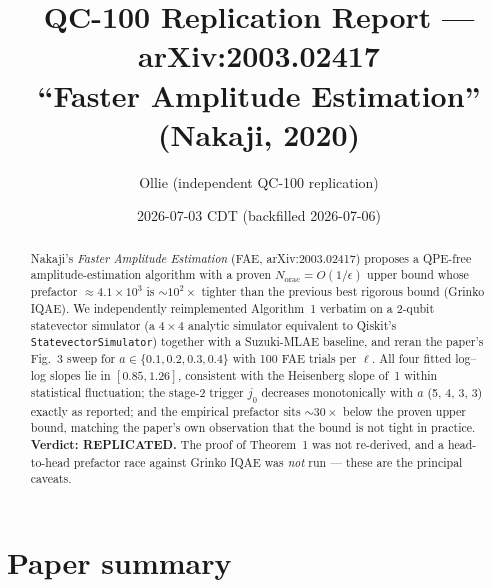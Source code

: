 \documentclass[11pt]{article}
\title{QC-100 Replication Report --- arXiv:2003.02417 \\
       \large ``Faster Amplitude Estimation'' (Nakaji, 2020)}
\author{Ollie (independent QC-100 replication)}
\date{2026-07-03 CDT (backfilled 2026-07-06)}
\begin{document}
\maketitle

\begin{abstract}
Nakaji's \emph{Faster Amplitude Estimation} (FAE, arXiv:2003.02417) proposes a QPE-free amplitude-estimation algorithm with a proven $N_{\mathrm{orac}} = O(1/\epsilon)$ upper bound whose prefactor $\approx 4.1\times 10^{3}$ is $\sim 10^{2}\times$ tighter than the previous best rigorous bound (Grinko IQAE). We independently reimplemented Algorithm~1 verbatim on a 2-qubit statevector simulator (a $4\times 4$ analytic simulator equivalent to Qiskit's \texttt{StatevectorSimulator}) together with a Suzuki-MLAE baseline, and reran the paper's Fig.~3 sweep for $a \in \{0.1, 0.2, 0.3, 0.4\}$ with 100 FAE trials per $\ell$. All four fitted log--log slopes lie in $[0.85, 1.26]$, consistent with the Heisenberg slope of~1 within statistical fluctuation; the stage-2 trigger $j_0$ decreases monotonically with $a$ (5, 4, 3, 3) exactly as reported; and the empirical prefactor sits $\sim 30\times$ below the proven upper bound, matching the paper's own observation that the bound is not tight in practice. \textbf{Verdict: REPLICATED.} The proof of Theorem~1 was not re-derived, and a head-to-head prefactor race against Grinko IQAE was \emph{not} run --- these are the principal caveats.
\end{abstract}

\section{Paper summary}
\end{document}
